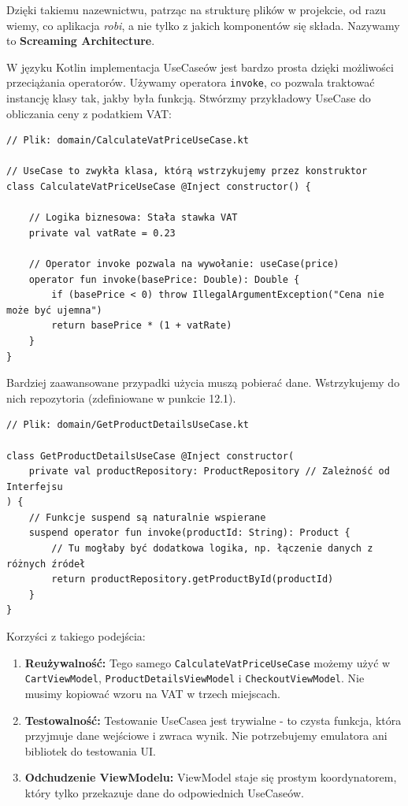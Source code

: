 Dzięki takiemu nazewnictwu, patrząc na strukturę plików w projekcie, od razu wiemy, co aplikacja \textit{robi}, a nie tylko z jakich komponentów się składa. Nazywamy to \textbf{Screaming Architecture}.

W języku Kotlin implementacja UseCaseów jest bardzo prosta dzięki możliwości przeciążania operatorów. Używamy operatora \texttt{invoke}, co pozwala traktować instancję klasy tak, jakby była funkcją. Stwórzmy przykładowy UseCase do obliczania ceny z podatkiem VAT:

\begin{verbatim}
// Plik: domain/CalculateVatPriceUseCase.kt

// UseCase to zwykła klasa, którą wstrzykujemy przez konstruktor
class CalculateVatPriceUseCase @Inject constructor() {

    // Logika biznesowa: Stała stawka VAT
    private val vatRate = 0.23 

    // Operator invoke pozwala na wywołanie: useCase(price)
    operator fun invoke(basePrice: Double): Double {
        if (basePrice < 0) throw IllegalArgumentException("Cena nie może być ujemna")
        return basePrice * (1 + vatRate)
    }
}
\end{verbatim}

Bardziej zaawansowane przypadki użycia muszą pobierać dane. Wstrzykujemy do nich repozytoria (zdefiniowane w punkcie 12.1).

\begin{verbatim}
// Plik: domain/GetProductDetailsUseCase.kt

class GetProductDetailsUseCase @Inject constructor(
    private val productRepository: ProductRepository // Zależność od Interfejsu
) {
    // Funkcje suspend są naturalnie wspierane
    suspend operator fun invoke(productId: String): Product {
        // Tu mogłaby być dodatkowa logika, np. łączenie danych z różnych źródeł
        return productRepository.getProductById(productId)
    }
}
\end{verbatim}

Korzyści z takiego podejścia:
\begin{enumerate}
    \item \textbf{Reużywalność:} Tego samego \texttt{CalculateVatPriceUseCase} możemy użyć w \texttt{CartViewModel}, \texttt{ProductDetailsViewModel} i \texttt{CheckoutViewModel}. Nie musimy kopiować wzoru na VAT w trzech miejscach.
    \item \textbf{Testowalność:} Testowanie UseCasea jest trywialne - to czysta funkcja, która przyjmuje dane wejściowe i zwraca wynik. Nie potrzebujemy emulatora ani bibliotek do testowania UI.
    \item \textbf{Odchudzenie ViewModelu:} ViewModel staje się prostym koordynatorem, który tylko przekazuje dane do odpowiednich UseCaseów.
\end{enumerate}

